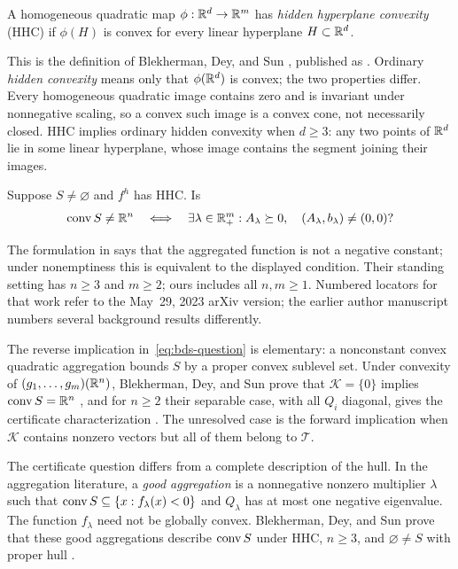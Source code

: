 \begin{definition}
\label{def:hhc}
A homogeneous quadratic map $\phi:\mathbb R^d\to\mathbb R^m$ has
\emph{hidden hyperplane convexity} (HHC) if $\phi(H)$ is convex for
every linear hyperplane $H\subset\mathbb R^d$.
\end{definition}

This is the definition of Blekherman, Dey, and Sun
\citep[Definition~2.1]{BDSpreprint}, published as \citep{BDS2024}. Ordinary \emph{hidden convexity}
means only that $\phi(\mathbb R^d)$ is convex; the two properties differ.
Every homogeneous quadratic image contains zero and is invariant under
nonnegative scaling, so a convex such image is a convex cone, not
necessarily closed.
HHC implies ordinary hidden convexity when $d\geq3$:
any two points of $\mathbb R^d$ lie in some linear hyperplane, whose image
contains the segment joining their images.

\begin{question}
\label{question:bds}
Suppose $S\ne\varnothing$ and $f^h$ has HHC. Is
\begin{equation}\label{eq:bds-question}
 \operatorname{conv} S\ne\mathbb R^n
 \quad\Longleftrightarrow\quad
 \exists\lambda\in\mathbb R^m_+:
 A_\lambda\succeq0,\quad (A_\lambda,b_\lambda)\ne(0,0)?
\end{equation}
\end{question}

The formulation in \citet[Conjecture~3.3]{BDSpreprint} says that the
aggregated function is not a negative constant; under nonemptiness this
is equivalent to the displayed condition. Their standing setting has
$n\geq3$ and $m\geq2$; ours includes all $n,m\geq1$. Numbered
locators for that work refer to the May~29, 2023 arXiv version; the
earlier author manuscript numbers several background results
differently.

The reverse implication in~\eqref{eq:bds-question} is elementary:
a nonconstant convex quadratic aggregation bounds $S$ by a proper convex
sublevel set. Under convexity of $(g_1,\ldots,g_m)(\mathbb R^n)$, Blekherman,
Dey, and Sun prove that $\mathcal K=\{0\}$ implies $\operatorname{conv} S=\mathbb R^n$
\citep[Proposition~2.14]{BDSpreprint}, and for $n\geq2$ their separable
case, with all $Q_i$ diagonal, gives the certificate characterization
\citep[Theorem~2.12]{BDSpreprint}. The unresolved case is the forward
implication when $\mathcal K$ contains nonzero vectors but all of them
belong to $\mathcal T$.

The certificate question differs from a complete description of the
hull. In the aggregation literature, a
\emph{good aggregation} is a nonnegative nonzero multiplier $\lambda$
such that $\operatorname{conv} S\subseteq\{x:f_\lambda(x)<0\}$ and $Q_\lambda$
has at most one negative eigenvalue. The function $f_\lambda$ need not
be globally convex. Blekherman, Dey, and Sun prove that these good
aggregations describe $\operatorname{conv} S$ under HHC, $n\geq3$,
and $\varnothing\ne S$ with proper hull
\citep[Theorem~2.9]{BDSpreprint}.

